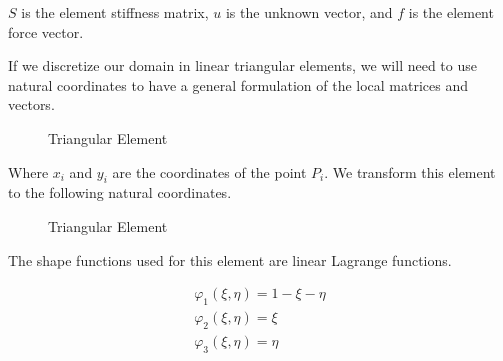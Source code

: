 \documentclass{article}
\begin{document}
$S$ is the element stiffness matrix, $u$ is the unknown vector, and $f$ is the element force vector.

If we discretize our domain in linear triangular elements, we will need to use natural coordinates to have a general formulation of the local matrices and vectors.

\begin{figure}[h]
    \centering
    \caption{Triangular Element}
    \label{fig:global_Tria}
\end{figure}

Where $x_i$ and $y_i$ are the coordinates of the point $P_i$. We transform this element to the following natural coordinates.


\begin{figure}[h]
    \centering
    \caption{Triangular Element}
    \label{fig:local_Tria}
\end{figure}

The shape functions used for this element are linear Lagrange functions.

\begin{equation}\label{eq:SF_t}
    \begin{gathered}
        \varphi_1(\xi,\eta)=1-\xi-\eta\\
        \varphi_2(\xi,\eta)=\xi\\
        \varphi_3(\xi,\eta)=\eta
    \end{gathered}
\end{equation}
\end{document}
